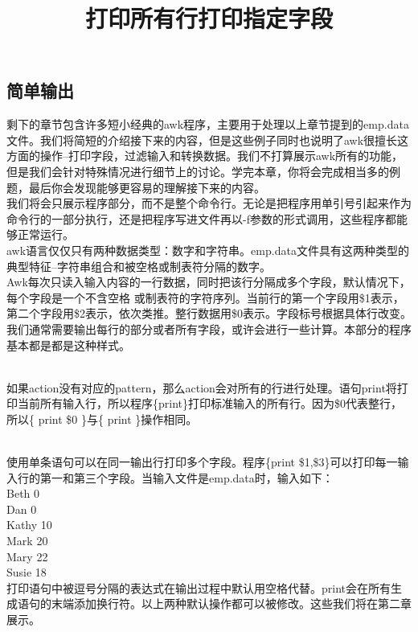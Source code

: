 \documentclass[10pt,fancyhdr,UTF-8]{ctexart}
\begin{document}
\subsection{简单输出} 
剩下的章节包含许多短小经典的awk程序，主要用于处理以上章节提到的emp.data文件。我们将简短的介绍接下来的内容，但是这些例子同时也说明了awk很擅长这方面的操作--打印字段，过滤输入和转换数据。我们不打算展示awk所有的功能，但是我们会针对特殊情况进行细节上的讨论。学完本章，你将会完成相当多的例题，最后你会发现能够更容易的理解接下来的内容。\\
\indent 我们将会只展示程序部分，而不是整个命令行。无论是把程序用单引号引起来作为命令行的一部分执行，还是把程序写进文件再以-f参数的形式调用，这些程序都能够正常运行。 \\
\indent awk语言仅仅只有两种数据类型：数字和字符串。emp.data文件具有这两种类型的典型特征--字符串组合和被空格或制表符分隔的数字。
\\
\indent Awk每次只读入输入内容的一行数据，同时把该行分隔成多个字段，默认情况下，每个字段是一个不含空格 或制表符的字符序列。当前行的第一个字段用\$1表示，第二个字段用\$2表示，依次类推。整行数据用\$0表示。字段标号根据具体行改变。 \\
我们通常需要输出每行的部分或者所有字段，或许会进行一些计算。本部分的程序基本都是都是这种样式。 \\

\title{\textbf{打印所有行}}  \\
\indent 如果action没有对应的pattern，那么action会对所有的行进行处理。语句print将打印当前所有输入行，所以程序\{print\}打印标准输入的所有行。因为\$0代表整行，所以\{ print \$0  \}与\{ print  \}操作相同。 \\

\title{\textbf{打印指定字段}} \\
\indent 使用单条语句可以在同一输出行打印多个字段。程序\{print \$1,\$3\}可以打印每一输入行的第一和第三个字段。当输入文件是emp.data时，输入如下： \\
\indent Beth     0 \\
\indent Dan      0 \\
\indent Kathy   10 \\
\indent Mark    20 \\
\indent Mary    22 \\
\indent Susie    18 \\
\indent 打印语句中被逗号分隔的表达式在输出过程中默认用空格代替。print会在所有生成语句的末端添加换行符。以上两种默认操作都可以被修改。这些我们将在第二章展示。 \\
\end{document}
